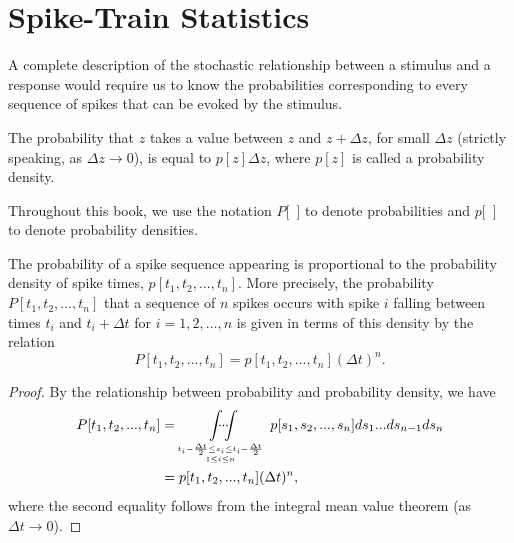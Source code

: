 \section{Spike-Train Statistics}
\label{sec:1.4}


\begin{rem}
  A complete description of the stochastic relationship between a stimulus and a response would require us to know the probabilities corresponding to every sequence of spikes that can be evoked by the stimulus.    
\end{rem}

\begin{lem}
    The probability that $z$ takes a value between $z$ and $z+ \Delta z$, for small $\Delta z$ (strictly speaking, as $\Delta z \to 0$), is equal to $p[z]\Delta z$, where $p[z]$ is called a probability density.
\end{lem}

\begin{ntn}    
    Throughout this book,  we use the notation $P$[\ ] to denote probabilities and $p$[\ ] to denote probability densities.
\end{ntn}    

\begin{thm}
  The probability of a spike sequence appearing is proportional to the probability density of spike times,  $p[t_1, t_2, ..., t_n]$. More precisely, the probability $P[t_1,t_2,...,t_n]$ that a sequence of $n$ spikes occurs with spike $i$ falling between times $t_i$ and $t_i+\Delta t$ for $i= 1,2,\dots,n$ is given in terms of this density by the relation 
  \begin{equation}
    P[t_1,t_2,...,t_n]=p[t_1,t_2,...,t_n](\Delta t)^n.        
  \end{equation}
  \begin{proof}
    By the relationship between probability and probability density, we have
    \begin{displaymath}
      \begin{aligned}
        P[t_1,t_2,...,t_n] &= \idotsint\limits_{t_i-\frac{\Delta t}{2} \leq s_i \leq t_i-\frac{\Delta t}{2}\atop 1\leq i\leq n} p[s_1,s_2,...,s_n]ds_1 ...ds_{n-1}ds_{n}\\
        &= p[t_1,t_2,...,t_n](\Delta t)^n,
      \end{aligned}
    \end{displaymath}
    where the second equality follows from the integral mean value theorem (as $\Delta t \to 0$).
  \end{proof}\qedhere
\end{thm}


